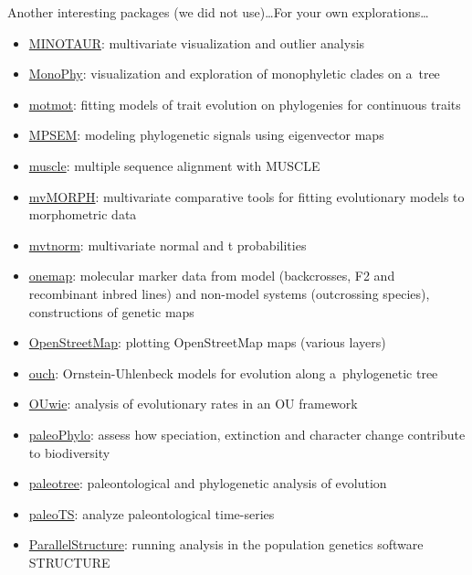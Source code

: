 \documentclass[compress, xelatex, 11pt, xcolor=svgnames, aspectratio=169,
	hyperref={
		bookmarks=true,
		unicode=true,
		colorlinks=true,
		pdftitle={Molecular data in R},
		plainpages=false,
		pdfauthor={Vojtech Zeisek},
		pdfsubject={Course about phylogeny and evolution in R},
		pdfcreator={XeLaTeX},
		pdfkeywords={R, evolution, phylogeny, molecular data},
		linkcolor=Crimson, %
		anchorcolor=Magenta, %
		citecolor=Magenta, %
		filecolor=Magenta, %
		menucolor=Magenta, %
		urlcolor=DodgerBlue, %
		},
	url={hyphens, lowtilde} %
	]{beamer}
\begin{document}
\begin{frame}[allowframebreaks]{Another interesting packages (we did not use)\ldots}{For your own explorations\ldots}
\begin{itemize}
		\item \href{https://github.com/NESCent/MINOTAUR}{MINOTAUR}: multivariate visualization and outlier analysis
		\item \href{https://CRAN.R-project.org/package=MonoPhy}{MonoPhy}: visualization and exploration of monophyletic clades on a~tree
		\item \href{https://CRAN.R-project.org/package=motmot}{motmot}: fitting models of trait evolution on phylogenies for continuous traits
		\item \href{https://CRAN.R-project.org/package=MPSEM}{MPSEM}: modeling phylogenetic signals using eigenvector maps
		\item \href{https://bioconductor.org/packages/release/bioc/html/muscle.html}{muscle}: multiple sequence alignment with MUSCLE
		\item \href{https://CRAN.R-project.org/package=mvMORPH}{mvMORPH}: multivariate comparative tools for fitting evolutionary models to morphometric data
		\item \href{https://CRAN.R-project.org/package=mvtnorm}{mvtnorm}: multivariate normal and t probabilities
		\item \href{https://CRAN.R-project.org/package=onemap}{onemap}: molecular marker data from model (backcrosses, F2 and recombinant inbred lines) and non-model systems (outcrossing species), constructions of genetic maps
		\item \href{https://CRAN.R-project.org/package=OpenStreetMap}{OpenStreetMap}: plotting OpenStreetMap maps (various layers)
		\item \href{https://CRAN.R-project.org/package=ouch}{ouch}: Ornstein-Uhlenbeck models for evolution along a~phylogenetic tree
		\item \href{https://CRAN.R-project.org/package=OUwie}{OUwie}: analysis of evolutionary rates in an OU framework
		\item \href{https://r-forge.r-project.org/projects/paleophylo/}{paleoPhylo}: assess how speciation, extinction and character change contribute to biodiversity
		\item \href{https://CRAN.R-project.org/package=paleotree}{paleotree}: paleontological and phylogenetic analysis of evolution
		\item \href{https://CRAN.R-project.org/package=paleoTS}{paleoTS}: analyze paleontological time-series
		\item \href{https://r-forge.r-project.org/projects/parallstructure/}{ParallelStructure}: running analysis in the population genetics software STRUCTURE

\end{itemize}
\end{frame}
\end{document}

